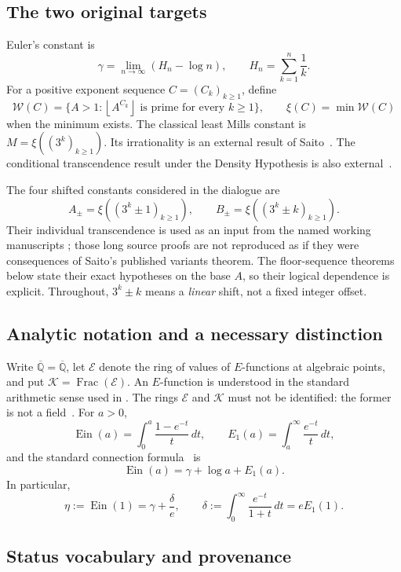 \documentclass[11pt,a4paper]{article}
\numberwithin{equation}{section}
\theoremstyle{definition}
\theoremstyle{remark}
\newcommand{\A}{\overline{\mathbb Q}}
\newcommand{\Q}{\mathbb Q}
\newcommand{\Er}{\mathcal E}
\newcommand{\K}{\mathcal K}
\newcommand{\Ein}{\operatorname{Ein}}
\newcommand{\floor}[1]{\left\lfloor #1\right\rfloor}
\DeclareMathOperator{\Frac}{Frac}
\begin{document}
\subsection{The two original targets}

Euler's constant is
\[
 \gamma=\lim_{n\to\infty}(H_n-\log n),\qquad
 H_n=\sum_{k=1}^n\frac1k.
\]
For a positive exponent sequence $C=(C_k)_{k\ge1}$, define
\[
 \mathcal W(C)=\{A>1:\floor{A^{C_k}}\text{ is prime for every }k\ge1\},
 \qquad \xi(C)=\min\mathcal W(C)
\]
when the minimum exists.  The classical least Mills constant is
$M=\xi((3^k)_{k\ge1})$.  Its irrationality is an external result of
Saito~\cite{Saito2025}.  The conditional transcendence result under the
Density Hypothesis is also external~\cite{SaitoVariants}.

The four shifted constants considered in the dialogue are
\[
 A_\pm=\xi((3^k\pm1)_{k\ge1}),\qquad
 B_\pm=\xi((3^k\pm k)_{k\ge1}).
\]
Their individual transcendence is used as an input from the named working
manuscripts \cite{VMRC064,VMRC008}; those long source proofs are not
reproduced as if they were consequences of Saito's published variants
theorem.  The floor-sequence theorems below state their exact hypotheses
on the base $A$, so their logical dependence is explicit.  Throughout,
$3^k\pm k$ means a \emph{linear} shift, not a fixed integer offset.

\subsection{Analytic notation and a necessary distinction}

Write $\A=\overline{\Q}$, let $\Er$ denote the ring of values of
$E$-functions at algebraic points, and put $\K=\Frac(\Er)$.  An
$E$-function is understood in the standard arithmetic sense used in
\cite{FR2026,Beukers2006}.  The rings $\Er$ and $\K$ must not be
identified: the former is not a field~\cite{FR2026}.
For $a>0$,
\[
 \Ein(a)=\int_0^a\frac{1-e^{-t}}t\,dt,
 \qquad E_1(a)=\int_a^\infty\frac{e^{-t}}t\,dt,
\]
and the standard connection formula~\cite{NISTDLMF} is
\[
 \Ein(a)=\gamma+\log a+E_1(a).
\]
In particular,
\begin{equation}\label{intro:eta-delta}
 \eta:=\Ein(1)=\gamma+\frac\delta e,
 \qquad
 \delta:=\int_0^\infty\frac{e^{-t}}{1+t}\,dt=eE_1(1).
\end{equation}

\clearpage
\subsection{Status vocabulary and provenance}
\end{document}
